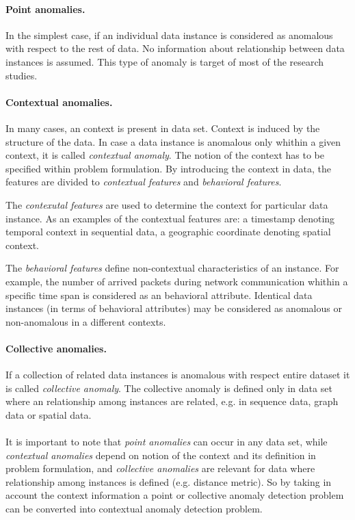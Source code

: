 \paragraph*{Point anomalies.} In the simplest case, if an individual data instance is considered as
anomalous with respect to the rest of data. No information about relationship between data instances
is assumed. This type of anomaly is target of most of the research studies.

\paragraph*{Contextual anomalies.} In many cases, an context is present in data set. 
Context is induced by the structure of the data. In case a data instance is anomalous only whithin
a given context, it is called \emph{contextual anomaly}. 
The notion of the context has to be specified within problem formulation. 
By introducing the context in data, the features are divided to \emph{contextual features}
and \emph{behavioral features}.

The \emph{contexutal features} are used to determine the context for 
particular data instance. As an examples of the contextual features are: a timestamp denoting 
temporal context in sequential data, a geographic coordinate denoting spatial context.

The \emph{behavioral features} define non-contextual characteristics of an instance. For example, 
the number of arrived packets during network communication whithin a specific time span is considered 
as an behavioral attribute. Identical data instances (in terms of behavioral attributes) 
may be considered as anomalous or non-anomalous in a different contexts.

\paragraph*{Collective anomalies.} If a collection of related data instances is anomalous with respect
entire dataset it is called \emph{collective anomaly}. The collective anomaly is defined only 
in data set where an relationship among instances are related, e.g. in sequence data, graph data or
spatial data.
\paragraph*{}
It is important to note that \emph{point anomalies} can occur in any data set, while 
\emph{contextual anomalies} depend on notion of the context and its definition in problem formulation, 
and \emph{collective anomalies} are relevant for data where relationship among instances is defined
(e.g. distance metric). So by taking in account the context information a point or collective anomaly
detection problem can be converted into contextual anomaly detection problem.

